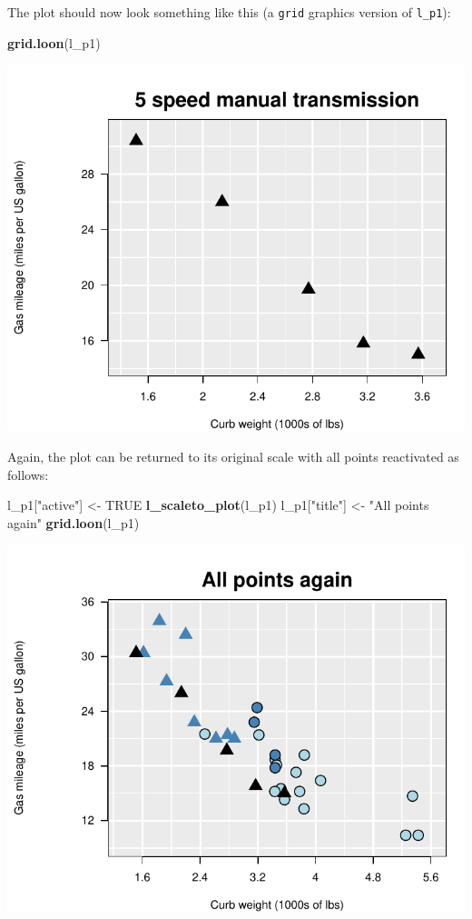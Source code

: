 \documentclass[]{article}
\newenvironment{Shaded}{\begin{snugshade}}{\end{snugshade}}
\newcommand{\KeywordTok}[1]{\textcolor[rgb]{0.13,0.29,0.53}{\textbf{#1}}}
\newcommand{\StringTok}[1]{\textcolor[rgb]{0.31,0.60,0.02}{#1}}
\newcommand{\OtherTok}[1]{\textcolor[rgb]{0.56,0.35,0.01}{#1}}
\newcommand{\NormalTok}[1]{#1}
\begin{document}
The plot should now look something like this (a \texttt{grid} graphics
version of \texttt{l\_p1}):

\begin{Shaded}
\begin{Highlighting}[]
\KeywordTok{grid.loon}\NormalTok{(l_p1)}
\end{Highlighting}
\end{Shaded}

\begin{center}\includegraphics[width=0.7\linewidth]{ggplots2loon_files/figure-latex/high gear manual grid plot-1} \end{center}

Again, the plot can be returned to its original scale with all points
reactivated as follows:

\begin{Shaded}
\begin{Highlighting}[]
\NormalTok{l_p1[}\StringTok{"active"}\NormalTok{] <-}\StringTok{ }\OtherTok{TRUE}
\KeywordTok{l_scaleto_plot}\NormalTok{(l_p1)}
\NormalTok{l_p1[}\StringTok{"title"}\NormalTok{] <-}\StringTok{ "All points again"}
\KeywordTok{grid.loon}\NormalTok{(l_p1)}
\end{Highlighting}
\end{Shaded}

\begin{center}\includegraphics[width=0.7\linewidth]{ggplots2loon_files/figure-latex/Back to all points-1} \end{center}
\end{document}
